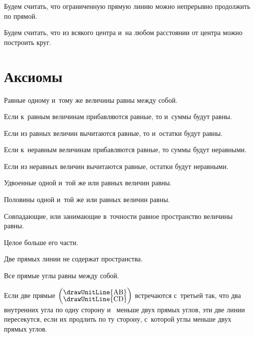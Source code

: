 \documentclass{byrne-book}
\begin{document}
\startpostulate{}\label{post:I.II}
Будем считать, что ограниченную прямую линию можно непрерывно продолжить по прямой.


\startpostulate{}\label{post:I.III}
Будем считать, что из всякого центра и~на любом расстоянии от центра можно построить круг.


\chapter*{Аксиомы}

\startaxiom{}\label{ax:I.I}
Равные одному и~тому же величины равны между собой.


\startaxiom{}\label{ax:I.II}
Если к~равным величинам прибавляются равные, то и~суммы будут равны.


\startaxiom{}\label{ax:I.III}
Если из равных величин вычитаются равные, то и~остатки будут равны.


\startaxiom{}\label{ax:I.IV}
Если к~неравным величинам прибавляются равные, то суммы будут неравными.


\startaxiom{}\label{ax:I.V}
Если из неравных величин вычитаются  равные, остатки будут неравными.


\startaxiom{}\label{ax:I.VI}
Удвоенные одной и~той же или равных величин равны.


\startaxiom{}\label{ax:I.VII}
Половины одной и~той же или равных величин равны.


\startaxiom{}\label{ax:I.VIII}
Совпадающие, или занимающие в~точности равное пространство величины равны.


\startaxiom{}\label{ax:I.IX}
Целое больше его части.


\startaxiom{}\label{ax:I.X}
Две прямых линии не содержат пространства.


\startaxiom{}\label{ax:I.XI}
Все прямые углы равны между собой.


\startaxiom{}\label{ax:I.XII}
\drawCurrentPictureInMargin
Если две прямые $\left(\vcenter{\nointerlineskip\hbox{\drawUnitLine{AB}}\nointerlineskip\hbox{\drawUnitLine{CD}}}\right)$ встречаются с~третьей  так, что два внутренних угла по одну сторону  и~ меньше двух прямых углов, эти две линии пересекутся, если их продлить по ту сторону, с~которой углы меньше двух прямых углов.
\end{document}
